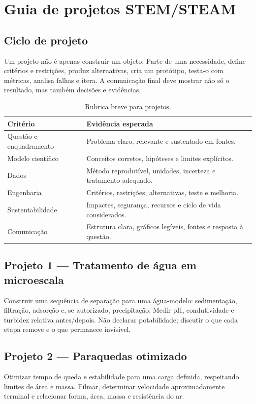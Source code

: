 \documentclass[11pt,a4paper,oneside]{book}
\begin{document}
\chapter{Guia de projetos STEM/STEAM}
\section{Ciclo de projeto}
Um projeto não é apenas construir um objeto. Parte de uma necessidade, define critérios e restrições, produz alternativas, cria um protótipo, testa-o com métricas, analisa falhas e itera. A comunicação final deve mostrar não só o resultado, mas também decisões e evidências.

\begin{table}[h!]
\centering
\caption{Rubrica breve para projetos.}
\begin{tabularx}{\textwidth}{p{}X}
\toprule
Critério & Evidência esperada \\
\midrule
Questão e enquadramento & Problema claro, relevante e sustentado em fontes. \\
Modelo científico & Conceitos corretos, hipóteses e limites explícitos. \\
Dados & Método reprodutível, unidades, incerteza e tratamento adequado. \\
Engenharia & Critérios, restrições, alternativas, teste e melhoria. \\
Sustentabilidade & Impactes, segurança, recursos e ciclo de vida considerados. \\
Comunicação & Estrutura clara, gráficos legíveis, fontes e resposta à questão. \\
\bottomrule
\end{tabularx}
\end{table}

\section{Projeto 1 — Tratamento de água em microescala}
Construir uma sequência de separação para uma água-modelo: sedimentação, filtração, adsorção e, se autorizado, precipitação. Medir pH, condutividade e turbidez relativa antes/depois. Não declarar potabilidade; discutir o que cada etapa remove e o que permanece invisível.

\section{Projeto 2 — Paraquedas otimizado}
Otimizar tempo de queda e estabilidade para uma carga definida, respeitando limites de área e massa. Filmar, determinar velocidade aproximadamente terminal e relacionar forma, área, massa e resistência do ar.
\end{document}
